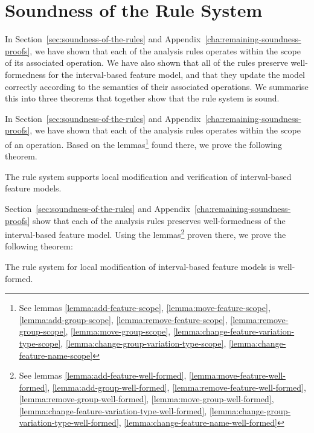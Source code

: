 \section{Soundness of the Rule System}
In Section~\vref{sec:soundness-of-the-rules} and Appendix~\vref{cha:remaining-soundness-proofs}, we have shown that each of the analysis rules operates within the scope of its associated operation. We have also shown that all of the rules preserve well-formedness for the interval-based feature model, and that they update the model correctly according to the semantics of their associated operations. We summarise this into three theorems that together show that the rule system is sound.

In Section~\ref{sec:soundness-of-the-rules} and Appendix~\ref{cha:remaining-soundness-proofs}, we have shown that each of the analysis rules operates within the scope of an operation. Based on the lemmas\footnote{See lemmas \ref{lemma:add-feature-scope}, \ref{lemma:move-feature-scope}, \ref{lemma:add-group-scope}, \ref{lemma:remove-feature-scope}, \ref{lemma:remove-group-scope}, \ref{lemma:move-group-scope}, \ref{lemma:change-feature-variation-type-scope}, \ref{lemma:change-group-variation-type-scope}, \ref{lemma:change-feature-name-scope}} found there, we prove the following theorem.
\\
\begin{theorem}
  The rule system supports local modification and verification of interval-based feature models.
\end{theorem}

Section~\ref{sec:soundness-of-the-rules} and Appendix~\ref{cha:remaining-soundness-proofs} show that each of the analysis rules preserves well-formedness of the interval-based feature model. Using the lemmas\footnote{See lemmas \ref{lemma:add-feature-well-formed}, \ref{lemma:move-feature-well-formed}, \ref{lemma:add-group-well-formed}, \ref{lemma:remove-feature-well-formed}, \ref{lemma:remove-group-well-formed}, \ref{lemma:move-group-well-formed}, \ref{lemma:change-feature-variation-type-well-formed}, \ref{lemma:change-group-variation-type-well-formed}, \ref{lemma:change-feature-name-well-formed}} proven there, we prove the following theorem: 
\\
\begin{theorem}
  The rule system for local modification of interval-based feature models is well-formed.
\end{theorem}


